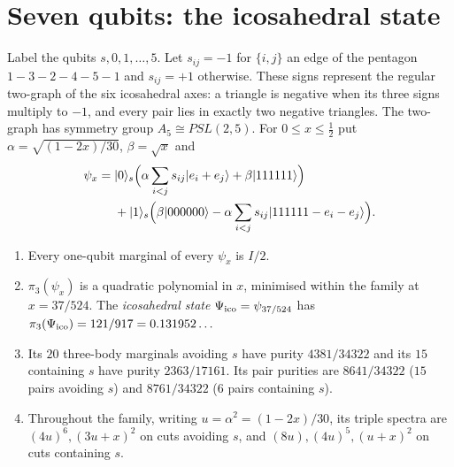 \section{Seven qubits: the icosahedral state}\label{sec:ico}

Label the qubits $s,0,1,\dots,5$. Let $s_{ij}=-1$ for $\{i,j\}$ an edge of the pentagon
$1\!-\!3\!-\!2\!-\!4\!-\!5\!-\!1$ and $s_{ij}=+1$ otherwise. These signs represent the regular two-graph of the six
icosahedral axes: a triangle is negative when its three signs multiply to $-1$, and every pair
lies in exactly two negative triangles. The two-graph has symmetry group $A_5\cong PSL(2,5)$. For $0\le x\le\tfrac12$ put
$\alpha=\sqrt{(1-2x)/30}$, $\beta=\sqrt x$ and
\begin{equation}\label{eq:ico}
\begin{split}
  \psi_x ={}& |0\rangle_s\Bigl(\alpha\sum_{i<j}s_{ij}|e_i+e_j\rangle + \beta|111111\rangle\Bigr)\\
         &+ |1\rangle_s\Bigl(\beta|000000\rangle - \alpha\sum_{i<j}s_{ij}|111111-e_i-e_j\rangle\Bigr).
\end{split}
\end{equation}

\begin{theorem}\label{thm:ico}
\leavevmode\begin{enumerate}
  \item Every one-qubit marginal of every $\psi_x$ is $I/2$.
  \item $\pi_3(\psi_x)$ is a quadratic polynomial in $x$, minimised within the family at $x=37/524$. The
    \emph{icosahedral state} $\Psi_{\mathrm{ico}}=\psi_{37/524}$ has $\pi_3(\Psi_{\mathrm{ico}})=121/917=0.131952\ldots$
  \item Its $20$ three-body marginals avoiding $s$ have purity $4381/34322$ and its $15$ containing $s$
    have purity $2363/17161$. Its pair purities are $8641/34322$ ($15$ pairs avoiding $s$) and
    $8761/34322$ ($6$ pairs containing $s$).
  \item Throughout the family, writing $u=\alpha^2=(1-2x)/30$,
    its triple spectra are $(4u)^6,(3u+x)^2$ on cuts avoiding $s$,
    and $(8u),(4u)^5,(u+x)^2$ on cuts containing $s$.
\end{enumerate}
\end{theorem}

